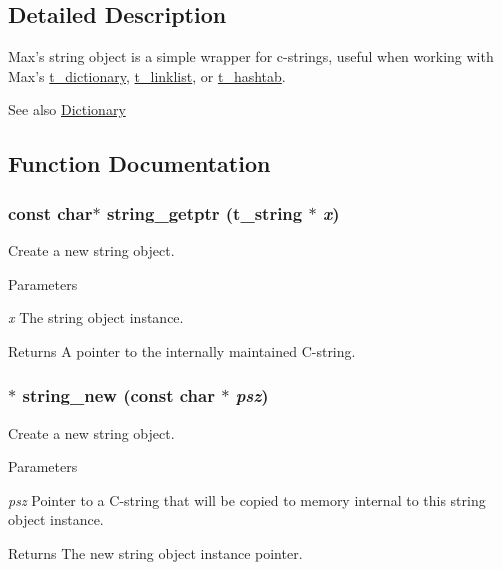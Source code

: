 \subsection{Detailed Description}
Max's string object is a simple wrapper for c-\/strings, useful when working with Max's \hyperlink{structt__dictionary}{t\_\-dictionary}, \hyperlink{structt__linklist}{t\_\-linklist}, or \hyperlink{structt__hashtab}{t\_\-hashtab}. \begin{DoxySeeAlso}{See also}
\hyperlink{group__dictionary}{Dictionary} 
\end{DoxySeeAlso}


\subsection{Function Documentation}
\hypertarget{group__string_ga1d65f5effcf8d1f77b45f2603280887d}{
\subsubsection[{string\_\-getptr}]{\setlength{\rightskip}{0pt plus 5cm}const char$\ast$ string\_\-getptr ({\bf t\_\-string} $\ast$ {\em x})}}
\label{group__string_ga1d65f5effcf8d1f77b45f2603280887d}


Create a new string object. 
\begin{DoxyParams}{Parameters}
\item[{\em x}]The string object instance. \end{DoxyParams}
\begin{DoxyReturn}{Returns}
A pointer to the internally maintained C-\/string. 
\end{DoxyReturn}
\hypertarget{group__string_ga9fce58b43883b838697077fc674a48d9}{
\subsubsection[{string\_\-new}]{$\ast$ string\_\-new (const char $\ast$ {\em psz})}}
\label{group__string_ga9fce58b43883b838697077fc674a48d9}


Create a new string object. 
\begin{DoxyParams}{Parameters}
\item[{\em psz}]Pointer to a C-\/string that will be copied to memory internal to this string object instance. \end{DoxyParams}
\begin{DoxyReturn}{Returns}
The new string object instance pointer. 
\end{DoxyReturn}
